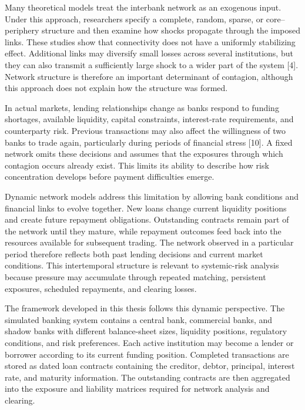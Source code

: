 Many theoretical models treat the interbank network as an exogenous
input. Under this approach, researchers specify a complete, random,
sparse, or core--periphery structure and then examine how shocks
propagate through the imposed links. These studies show that
connectivity does not have a uniformly stabilizing effect. Additional
links may diversify small losses across several institutions, but they
can also transmit a sufficiently large shock to a wider part of the
system {[}4{]}. Network structure is therefore an important determinant
of contagion, although this approach does not explain how the structure
was formed.

In actual markets, lending relationships change as banks respond to
funding shortages, available liquidity, capital constraints,
interest-rate requirements, and counterparty risk. Previous transactions
may also affect the willingness of two banks to trade again,
particularly during periods of financial stress {[}10{]}. A fixed
network omits these decisions and assumes that the exposures through
which contagion occurs already exist. This limits its ability to
describe how risk concentration develops before payment difficulties
emerge.

Dynamic network models address this limitation by allowing bank
conditions and financial links to evolve together. New loans change
current liquidity positions and create future repayment obligations.
Outstanding contracts remain part of the network until they mature,
while repayment outcomes feed back into the resources available for
subsequent trading. The network observed in a particular period
therefore reflects both past lending decisions and current market
conditions. This intertemporal structure is relevant to systemic-risk
analysis because pressure may accumulate through repeated matching,
persistent exposures, scheduled repayments, and clearing losses.

The framework developed in this thesis follows this dynamic perspective.
The simulated banking system contains a central bank, commercial banks,
and shadow banks with different balance-sheet sizes, liquidity
positions, regulatory conditions, and risk preferences. Each active
institution may become a lender or borrower according to its current
funding position. Completed transactions are stored as dated loan
contracts containing the creditor, debtor, principal, interest rate, and
maturity information. The outstanding contracts are then aggregated into
the exposure and liability matrices required for network analysis and
clearing.


